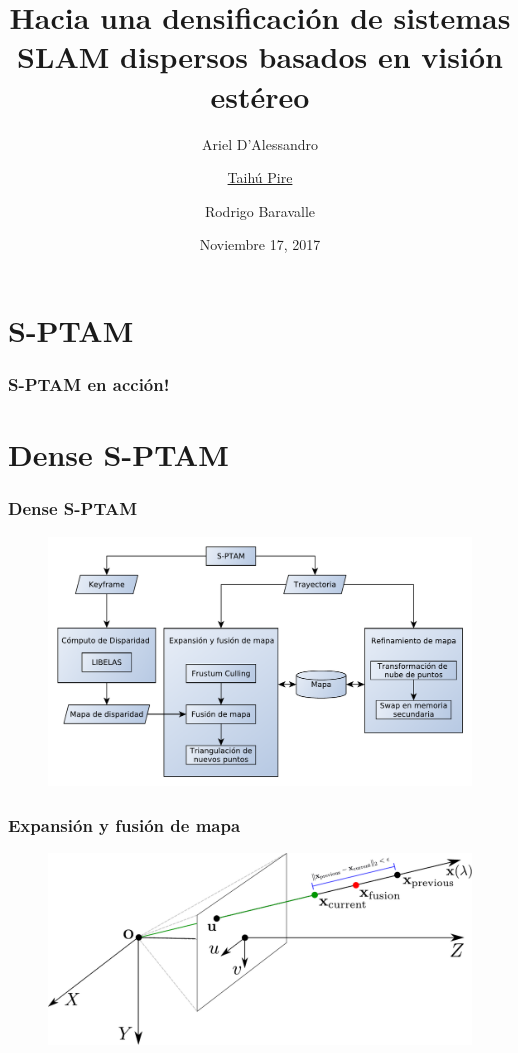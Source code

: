 \documentclass[compress]{beamer}
\title{Hacia una densificación de sistemas SLAM	dispersos basados en visión estéreo}
\author{Ariel D'Alessandro \and \underline{Taihú Pire} \and Rodrigo Baravalle}
\institute{	CIFASIS - CONICET - UNR}
\date{\scriptsize{Noviembre 17, 2017}}
\begin{document}
\frame{\titlepage}

\section{S-PTAM}

\begin{frame}
	\frametitle{S-PTAM en acción!}
	\centering
	
\end{frame}


\section{Dense S-PTAM}

\begin{frame}
	\frametitle{Dense S-PTAM}
	\begin{figure}[htb]
		\centering
		\includegraphics[width=\columnwidth]{images/dense_diagram.pdf}
	\end{figure}
\end{frame}

\begin{frame}
	\frametitle{Expansión y fusión de mapa}
	\begin{figure}[htb]
		\centering
		\includegraphics[width=\columnwidth]{images/map_fusion.pdf}
	\end{figure}
\end{frame}
\end{document}
